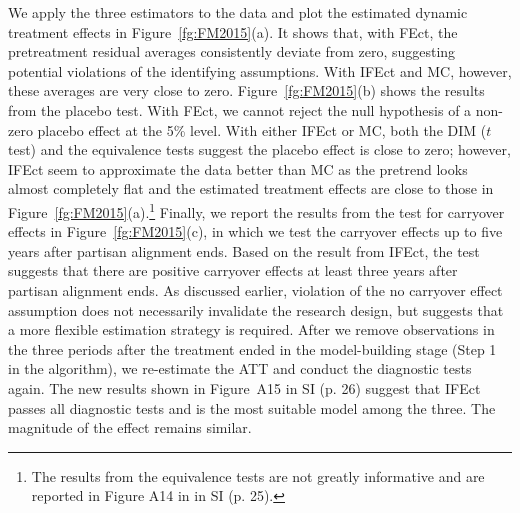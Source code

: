 \documentclass[12pt]{article}
\begin{document}
We apply the three estimators to the data and plot the estimated dynamic treatment effects in Figure~\ref{fg:FM2015}(a). It shows that, with FEct, the pretreatment residual averages consistently deviate from zero, suggesting potential violations of the identifying assumptions. With IFEct and MC, however, these averages are very close to zero. Figure~\ref{fg:FM2015}(b) shows the results from the placebo test. With FEct, we cannot reject the null hypothesis of a non-zero placebo effect at the 5\% level. With either IFEct or MC, both the DIM ($t$ test) and the equivalence tests suggest the placebo effect is close to zero; however, IFEct seem to approximate the data better than MC as the pretrend looks almost completely flat and the estimated treatment effects are close to those in Figure~\ref{fg:FM2015}(a).\footnote{The results from the equivalence tests are not greatly informative and are reported in Figure A14 in in SI (p. 25).} Finally, we report the results from the test for carryover effects in Figure~\ref{fg:FM2015}(c), in which we test the carryover effects up to five years after partisan alignment ends. Based on the result from IFEct, the test suggests that there are positive carryover effects at least three years after partisan alignment ends. As discussed earlier, violation of the no carryover effect assumption does not necessarily invalidate the research design, but suggests that a more flexible estimation strategy is required. After we remove observations in the three periods after the treatment ended in the model-building stage (Step 1 in the algorithm), we re-estimate the ATT and conduct the diagnostic tests again. The new results shown in Figure~A15 in SI (p. 26) suggest that IFEct passes all diagnostic tests and is the most suitable model among the three. The magnitude of the effect remains similar.
\end{document}
